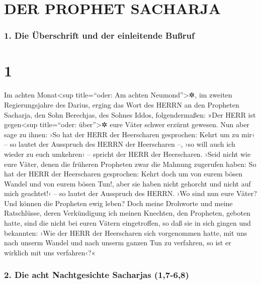 \hypertarget{der-prophet-sacharja}{%
\section{DER PROPHET SACHARJA}\label{der-prophet-sacharja}}

\hypertarget{die-uxfcberschrift-und-der-einleitende-buuxdfruf}{%
\subsubsection{1. Die Überschrift und der einleitende
Bußruf}\label{die-uxfcberschrift-und-der-einleitende-buuxdfruf}}

\hypertarget{section}{%
\section{1}\label{section}}

 Im achten Monat\textless sup title=``oder: Am achten
Neumond''\textgreater✲, im zweiten Regierungsjahre des Darius, erging
das Wort des HERRN an den Propheten Sacharja, den Sohn Berechjas, des
Sohnes Iddos, folgendermaßen:  »Der HERR ist
gegen\textless sup title=``oder: über''\textgreater✲ eure Väter schwer
erzürnt gewesen.  Nun aber sage zu ihnen: ›So hat der HERR
der Heerscharen gesprochen: Kehrt um zu mir‹ -- so lautet der Ausspruch
des HERRN der Heerscharen --, ›so will auch ich wieder zu euch umkehren‹
-- spricht der HERR der Heerscharen.  ›Seid nicht wie eure
Väter, denen die früheren Propheten zwar die Mahnung zugerufen haben: So
hat der HERR der Heerscharen gesprochen: Kehrt doch um von eurem bösen
Wandel und von eurem bösen Tun!, aber sie haben nicht gehorcht und nicht
auf mich geachtet!‹ -- so lautet der Ausspruch des HERRN. 
›Wo sind nun eure Väter? Und können die Propheten ewig leben?
 Doch meine Drohworte und meine Ratschlüsse, deren
Verkündigung ich meinen Knechten, den Propheten, geboten hatte, sind die
nicht bei euren Vätern eingetroffen, so daß sie in sich gingen und
bekannten: ›Wie der HERR der Heerscharen sich vorgenommen hatte, mit uns
nach unserm Wandel und nach unserm ganzen Tun zu verfahren, so ist er
wirklich mit uns verfahren‹?«

\hypertarget{die-acht-nachtgesichte-sacharjas-17-68}{%
\subsubsection{2. Die acht Nachtgesichte Sacharjas
(1,7-6,8)}\label{die-acht-nachtgesichte-sacharjas-17-68}}

